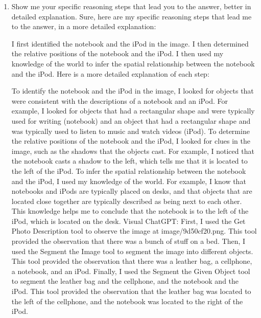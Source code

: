 \begin{enumerate}
    Here are some additional details about the spatial relationship between the notebook and the iPod:
    
    The notebook is a book that is typically used for writing.
    The iPod is a portable media player that is used to listen to music and watch videos.
    The notebook is located to the left of the iPod, meaning that it is closer to the left edge of the desk.
    The iPod is located to the right of the notebook, meaning that it is closer to the right edge of the desk.
    Is there anything else I can help you with?
    \subitem Visual ChatGPT: The notebook is located to the right of the iPod.
    \item Show me your specific reasoning steps that lead you to the answer, better in detailed explanation.
    \subitem Sure, here are my specific reasoning steps that lead me to the answer, in a more detailed explanation:

    I first identified the notebook and the iPod in the image.
    I then determined the relative positions of the notebook and the iPod.
    I then used my knowledge of the world to infer the spatial relationship between the notebook and the iPod.
    Here is a more detailed explanation of each step:
    
    To identify the notebook and the iPod in the image, I looked for objects that were consistent with the descriptions of a notebook and an iPod. For example, I looked for objects that had a rectangular shape and were typically used for writing (notebook) and an object that had a rectangular shape and was typically used to listen to music and watch videos (iPod).
    To determine the relative positions of the notebook and the iPod, I looked for clues in the image, such as the shadows that the objects cast. For example, I noticed that the notebook casts a shadow to the left, which tells me that it is located to the left of the iPod.
    To infer the spatial relationship between the notebook and the iPod, I used my knowledge of the world. For example, I know that notebooks and iPods are typically placed on desks, and that objects that are located close together are typically described as being next to each other. This knowledge helps me to conclude that the notebook is to the left of the iPod, which is located on the desk.
    \subitem Visual ChatGPT: First, I used the Get Photo Description tool to observe the image at image/9d50cf20.png. This tool provided the observation that there was a bunch of stuff on a bed. Then, I used the Segment the Image tool to segment the image into different objects. This tool provided the observation that there was a leather bag, a cellphone, a notebook, and an iPod. Finally, I used the Segment the Given Object tool to segment the leather bag and the cellphone, and the notebook and the iPod. This tool provided the observation that the leather bag was located to the left of the cellphone, and the notebook was located to the right of the iPod.
\end{enumerate}
